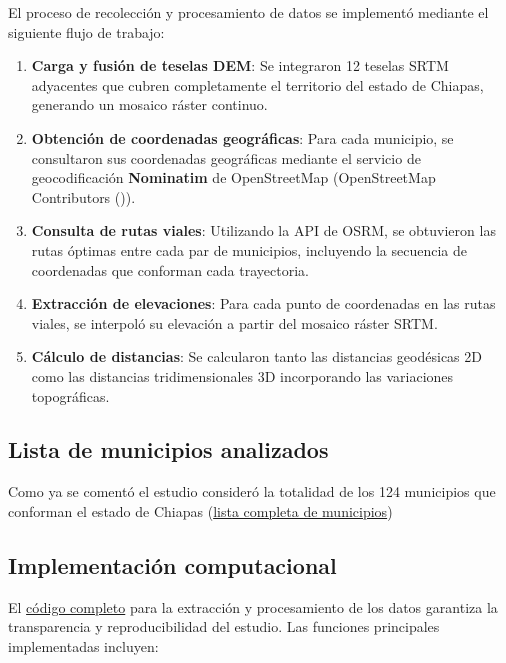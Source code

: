 \documentclass[
  spanish,
  us-letterpaper,
]{scrreprt}
\numberwithin{equation}{section}
\begin{document}
El proceso de recolección y procesamiento de datos se implementó
mediante el siguiente flujo de trabajo:

\begin{enumerate}
\def\labelenumi{\arabic{enumi}.}
\item
  \textbf{Carga y fusión de teselas DEM}: Se integraron 12 teselas SRTM
  adyacentes que cubren completamente el territorio del estado de
  Chiapas, generando un mosaico ráster continuo.
\item
  \textbf{Obtención de coordenadas geográficas}: Para cada municipio, se
  consultaron sus coordenadas geográficas mediante el servicio de
  geocodificación \textbf{Nominatim} de OpenStreetMap (OpenStreetMap
  Contributors ()).
\item
  \textbf{Consulta de rutas viales}: Utilizando la API de OSRM, se
  obtuvieron las rutas óptimas entre cada par de municipios, incluyendo
  la secuencia de coordenadas que conforman cada trayectoria.
\item
  \textbf{Extracción de elevaciones}: Para cada punto de coordenadas en
  las rutas viales, se interpoló su elevación a partir del mosaico
  ráster SRTM.
\item
  \textbf{Cálculo de distancias}: Se calcularon tanto las distancias
  geodésicas 2D como las distancias tridimensionales 3D incorporando las
  variaciones topográficas.
\end{enumerate}

\subsection{Lista de municipios
analizados}\label{lista-de-municipios-analizados}

Como ya se comentó el estudio consideró la totalidad de los 124
municipios que conforman el estado de Chiapas
(\href{https://github.com/AngelaOrtiz25/tesis_angela/blob/gh-pages/datos_codigos/lista_de_municipios_Chiapas.csv}{lista
completa de municipios})

\subsection{Implementación
computacional}\label{implementaciuxf3n-computacional}

El
\href{https://github.com/AngelaOrtiz25/tesis_angela/blob/gh-pages/datos_codigos/recolecion_de_datos_pagerank.ipynb}{código
completo} para la extracción y procesamiento de los datos garantiza la
transparencia y reproducibilidad del estudio. Las funciones principales
implementadas incluyen:
\end{document}
